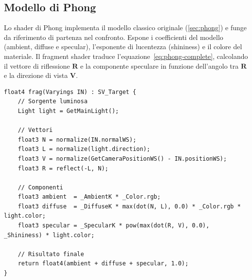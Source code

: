 \documentclass[12pt,a4paper,twoside]{book}
\begin{document}
\begin{minipage}{\textwidth}

\subsection{Modello di Phong}
\label{subsec:impl-phong}

Lo shader di Phong implementa il modello classico originale (\cref{sec:phong}) e funge da riferimento di partenza nel confronto. Espone i coefficienti del modello (ambient, diffuse e specular), l'esponente di lucentezza (shininess) e il colore del materiale. Il fragment shader traduce l'equazione~\eqref{eq:phong-complete}, calcolando il vettore di riflessione $\mathbf{R}$ e la componente speculare in funzione dell'angolo tra $\mathbf{R}$ e la direzione di vista $\mathbf{V}$.

\begin{lstlisting}[style=hlsl,
    caption={Fragment shader del modello di Phong.},
    label={lst:frag-phong}]
float4 frag(Varyings IN) : SV_Target {
    // Sorgente luminosa
    Light light = GetMainLight();
    
    // Vettori
    float3 N = normalize(IN.normalWS);
    float3 L = normalize(light.direction);
    float3 V = normalize(GetCameraPositionWS() - IN.positionWS);
    float3 R = reflect(-L, N);
    
    // Componenti
    float3 ambient  = _AmbientK * _Color.rgb;
    float3 diffuse  = _DiffuseK * max(dot(N, L), 0.0) * _Color.rgb * light.color;
    float3 specular = _SpecularK * pow(max(dot(R, V), 0.0), _Shininess) * light.color;
    
    // Risultato finale
    return float4(ambient + diffuse + specular, 1.0);
}
\end{lstlisting}

\end{minipage}
\end{document}
